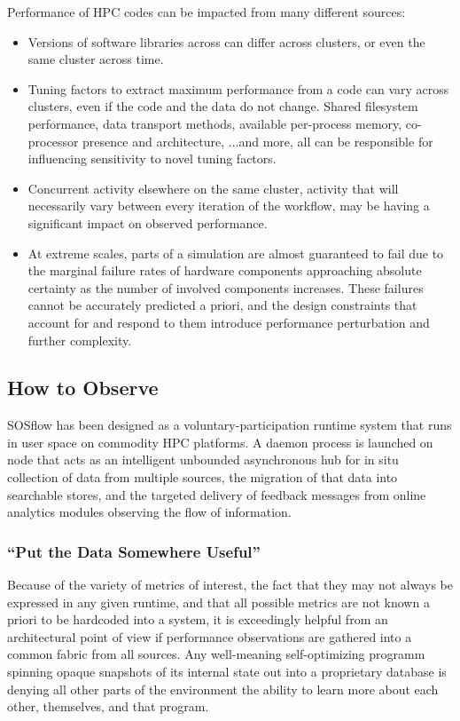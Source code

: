 Performance of HPC codes can be impacted from many different sources:
\begin{itemize}
    \item Versions of software libraries across can differ across
      clusters, or even the same cluster across time.
    \item Tuning factors to extract maximum performance from a code
      can vary across clusters, even if the code and the data do not
      change. Shared filesystem performance, data transport methods,
      available per-process memory, co-processor presence and
      architecture, ...and more, all can be responsible for
      influencing sensitivity to novel tuning factors.
    \item Concurrent activity elsewhere on the same cluster, activity
      that will necessarily vary between every iteration of the
      workflow, may be having a significant impact on observed
      performance.
    \item At extreme scales, parts of a simulation are almost
      guaranteed to fail due to the marginal failure rates of hardware
      components approaching absolute certainty as the number of
      involved components increases. These failures cannot be
      accurately predicted a priori, and the design constraints that
      account for and respond to them introduce performance
      perturbation and further complexity.
\end{itemize}



\subsection{How to Observe}
SOSflow has been designed as a voluntary-participation runtime system
that runs in user space on commodity HPC platforms. A daemon process
is launched on node that acts as an intelligent unbounded asynchronous
hub for in situ collection of data from multiple sources, the
migration of that data into searchable stores, and the targeted
delivery of feedback messages from online analytics modules observing
the flow of information.

\subsubsection{``Put the Data Somewhere Useful''}
Because of the variety of metrics of interest, the fact that they may
not always be expressed in any given runtime, and that all possible
metrics are not known a priori to be hardcoded into a system, it is
exceedingly helpful from an architectural point of view if performance
observations are gathered into a common fabric from all sources.  Any
well-meaning self-optimizing programm spinning opaque snapshots of its
internal state out into a proprietary database is denying all other
parts of the environment the ability to learn more about each other,
themselves, and that program.

